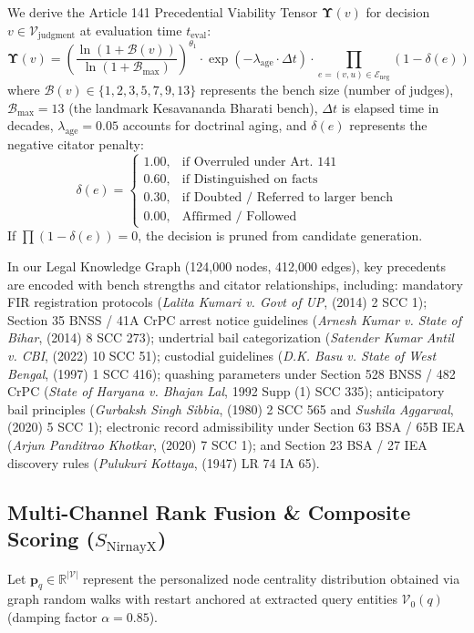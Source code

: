 \documentclass[conference]{IEEEtran}
\begin{document}
We derive the Article 141 Precedential Viability Tensor $\mathbf{\Upsilon}(v)$ for decision $v \in \mathcal{V}_{\text{judgment}}$ at evaluation time $t_{\text{eval}}$:
\begin{equation}
\mathbf{\Upsilon}(v) = \left( \frac{\ln(1 + \mathcal{B}(v))}{\ln(1 + \mathcal{B}_{\max})} \right)^{\theta_1} \cdot \exp\left(-\lambda_{\text{age}} \cdot \Delta t\right) \cdot \prod_{e = (v, u) \in \mathcal{E}_{\text{neg}}} \left(1 - \delta(e)\right)
\end{equation}
where $\mathcal{B}(v) \in \{1, 2, 3, 5, 7, 9, 13\}$ represents the bench size (number of judges), $\mathcal{B}_{\max} = 13$ (the landmark Kesavananda Bharati bench), $\Delta t$ is elapsed time in decades, $\lambda_{\text{age}} = 0.05$ accounts for doctrinal aging, and $\delta(e)$ represents the negative citator penalty:
$$\delta(e) = \begin{cases}
1.00, & \text{if Overruled under Art. 141} \\
0.60, & \text{if Distinguished on facts} \\
0.30, & \text{if Doubted / Referred to larger bench} \\
0.00, & \text{Affirmed / Followed}
\end{cases}$$
If $\prod (1 - \delta(e)) = 0$, the decision is pruned from candidate generation.

In our Legal Knowledge Graph (124,000 nodes, 412,000 edges), key precedents are encoded with bench strengths and citator relationships, including: mandatory FIR registration protocols (\textit{Lalita Kumari v. Govt of UP}, (2014) 2 SCC 1); Section 35 BNSS / 41A CrPC arrest notice guidelines (\textit{Arnesh Kumar v. State of Bihar}, (2014) 8 SCC 273); undertrial bail categorization (\textit{Satender Kumar Antil v. CBI}, (2022) 10 SCC 51); custodial guidelines (\textit{D.K. Basu v. State of West Bengal}, (1997) 1 SCC 416); quashing parameters under Section 528 BNSS / 482 CrPC (\textit{State of Haryana v. Bhajan Lal}, 1992 Supp (1) SCC 335); anticipatory bail principles (\textit{Gurbaksh Singh Sibbia}, (1980) 2 SCC 565 and \textit{Sushila Aggarwal}, (2020) 5 SCC 1); electronic record admissibility under Section 63 BSA / 65B IEA (\textit{Arjun Panditrao Khotkar}, (2020) 7 SCC 1); and Section 23 BSA / 27 IEA discovery rules (\textit{Pulukuri Kottaya}, (1947) LR 74 IA 65).

\subsection{Multi-Channel Rank Fusion \& Composite Scoring ($S_{\text{NirnayX}}$)}
Let $\mathbf{p}_q \in \mathbb{R}^{|\mathcal{V}|}$ represent the personalized node centrality distribution obtained via graph random walks with restart anchored at extracted query entities $\mathcal{V}_0(q)$ (damping factor $\alpha = 0.85$).
\end{document}
